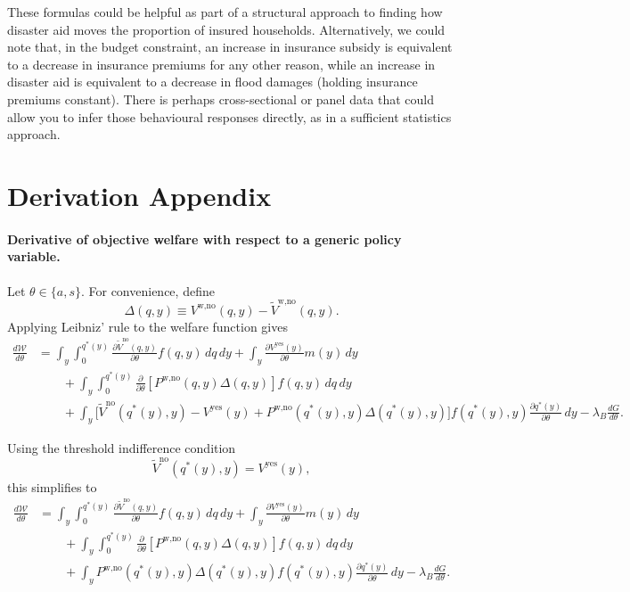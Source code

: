 \documentclass{article}
\begin{document}
These formulas could be helpful as part of a structural approach to finding how disaster aid moves the proportion of insured households. Alternatively, we could note that, in the budget constraint, an increase in insurance subsidy is equivalent to a decrease in insurance premiums for any other reason, while an increase in disaster aid is equivalent to a decrease in flood damages (holding insurance premiums constant). There is perhaps cross-sectional or panel data that could allow you to infer those behavioural responses directly, as in a sufficient statistics approach. 

\section*{Derivation Appendix}




\paragraph{Derivative of objective welfare with respect to a generic policy variable.}

Let $\theta\in\{a,s\}$. For convenience, define
\[
\Delta(q,y)\equiv V^{\text{w,no}}(q,y)-\tilde V^{\text{w,no}}(q,y).
\]
Applying Leibniz' rule to the welfare function gives
\begin{align}
\frac{d\mathcal W}{d\theta}
&=
\int_y\int_{0}^{q^{*}(y)}
\frac{\partial \tilde V^{\text{no}}(q,y)}{\partial \theta}
f(q,y)\,dq\,dy
+
\int_y
\frac{\partial V^{\text{yes}}(y)}{\partial \theta}
m(y)\,dy
\nonumber\\
&\qquad
+
\int_y\int_{0}^{q^{*}(y)}
\frac{\partial}{\partial\theta}
\left[
P^{\text{w,no}}(q,y)\Delta(q,y)
\right]
f(q,y)\,dq\,dy
\nonumber\\
&\qquad
+
\int_y
\Big[
\tilde V^{\text{no}}(q^{*}(y),y)-V^{\text{yes}}(y)
+
P^{\text{w,no}}(q^{*}(y),y)\Delta(q^{*}(y),y)
\Big]
f(q^{*}(y),y)\frac{\partial q^{*}(y)}{\partial\theta}\,dy
-\lambda_B\frac{dG}{d\theta}.
\end{align}

Using the threshold indifference condition
\[
\tilde V^{\text{no}}(q^{*}(y),y)=V^{\text{yes}}(y),
\]
this simplifies to
\begin{align}
\frac{d\mathcal W}{d\theta}
&=
\int_y\int_{0}^{q^{*}(y)}
\frac{\partial \tilde V^{\text{no}}(q,y)}{\partial \theta}
f(q,y)\,dq\,dy
+
\int_y
\frac{\partial V^{\text{yes}}(y)}{\partial \theta}
m(y)\,dy
\nonumber\\
&\qquad
+
\int_y\int_{0}^{q^{*}(y)}
\frac{\partial}{\partial\theta}
\left[
P^{\text{w,no}}(q,y)\Delta(q,y)
\right]
f(q,y)\,dq\,dy
\nonumber\\
&\qquad
+
\int_y
P^{\text{w,no}}(q^{*}(y),y)\Delta(q^{*}(y),y)
f(q^{*}(y),y)\frac{\partial q^{*}(y)}{\partial\theta}\,dy
-\lambda_B\frac{dG}{d\theta}.
\end{align}
\end{document}
